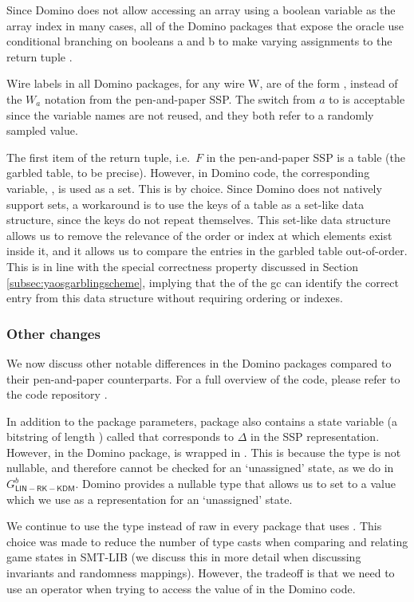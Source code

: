 Since Domino does not allow accessing an array using a boolean variable as the array index in many cases, all of the Domino packages that expose the  oracle use conditional branching on booleans a and b to make varying assignments to the return tuple .

Wire labels in all Domino packages, for any wire W, are of the form , instead of the $W_a$ notation from the pen-and-paper SSP. The switch from $a$ to  is acceptable since the variable names are not reused, and they both refer to a randomly sampled value.

The first item of the return tuple, i.e.\ $F$ in the pen-and-paper SSP is a table (the garbled table, to be precise). However, in Domino code, the corresponding variable, , is used as a set. This is by choice. Since Domino does not natively support sets, a workaround is to use the keys of a table as a set-like data structure, since the keys do not repeat themselves. This set-like data structure allows us to remove the relevance of the order or index at which elements exist inside it, and it allows us to compare the entries in the garbled table out-of-order. This is in line with the special correctness property discussed in Section \ref{subsec:yaosgarblingscheme}, implying that the \cevaluator of the \acrlong{gc} can identify the correct entry from this data structure without requiring ordering or indexes. 

\subsubsection{Other changes}
We now discuss other notable differences in the Domino packages compared to their pen-and-paper counterparts. For a full overview of the code, please refer to the code repository \cite{prateekfreexor:code}.

In addition to the package parameters, package  also contains a state variable (a bitstring of length ) called  that corresponds to $\Delta$ in the SSP representation. However, in the Domino package,  is wrapped in . This is because the  type is not nullable, and therefore cannot be checked for an `unassigned' state, as we do in $G^{b}_{\mathsf{LIN-RK-KDM}}$. Domino provides a nullable type  that allows us to set  to a  value which we use as a representation for an `unassigned' state.

We continue to use the  type instead of raw  in every package that uses . This choice was made to reduce the number of type casts when comparing and relating game states in SMT-LIB (we discuss this in more detail when discussing invariants and randomness mappings). However, the tradeoff is that we need to use an  operator when trying to access the value of  in the Domino code.

